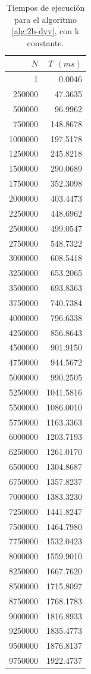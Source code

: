 \begin{table}
	\footnotesize
	\centering
	\begin{tabular}{|r|r|}
		\hline
		$N$ & $T$ $(ms)$ \\
		\hline
		1 & 0.0046 \\ 
		250000 & 47.3635 \\ 
		500000 & 96.9962 \\ 
		750000 & 148.8678 \\ 
		1000000 & 197.5178 \\ 
		1250000 & 245.8218 \\ 
		1500000 & 290.0689 \\ 
		1750000 & 352.3098 \\ 
		2000000 & 403.4473 \\ 
		2250000 & 448.6962 \\ 
		2500000 & 499.0547 \\ 
		2750000 & 548.7322 \\ 
		3000000 & 608.5418 \\ 
		3250000 & 653.2065 \\ 
		3500000 & 693.8363 \\ 
		3750000 & 740.7384 \\ 
		4000000 & 796.6338 \\ 
		4250000 & 856.8643 \\ 
		4500000 & 901.9150 \\ 
		4750000 & 944.5672 \\ 
		5000000 & 990.2505 \\ 
		5250000 & 1041.5816 \\ 
		5500000 & 1086.0010 \\ 
		5750000 & 1163.3363 \\ 
		6000000 & 1203.7193 \\ 
		6250000 & 1261.0170 \\ 
		6500000 & 1304.8687 \\ 
		6750000 & 1357.8237 \\ 
		7000000 & 1383.3230 \\ 
		7250000 & 1441.8247 \\ 
		7500000 & 1464.7980 \\ 
		7750000 & 1532.0423 \\ 
		8000000 & 1559.9010 \\ 
		8250000 & 1667.7620 \\ 
		8500000 & 1715.8097 \\ 
		8750000 & 1768.1783 \\ 
		9000000 & 1816.8933 \\ 
		9250000 & 1835.4773 \\ 
		9500000 & 1876.8137 \\ 
		9750000 & 1922.4737 \\ 
		\hline
	\end{tabular}
	\caption{Tiempos de ejecución para el algoritmo 
		\ref{alg:2b-dyv}, con k constante.}
	\label{tab:2b-dyv-n}
\end{table}

